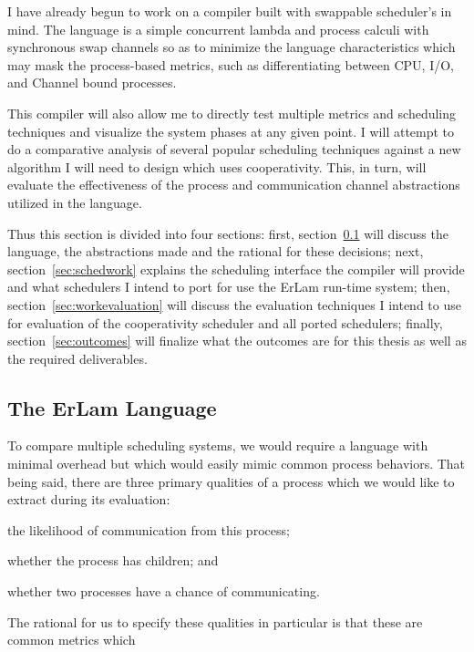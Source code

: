 I have already begun to work on a compiler built with swappable scheduler's in mind. The language
is a simple concurrent lambda and process calculi with synchronous swap channels so as to minimize 
the language characteristics which may mask the process-based metrics, such as differentiating between CPU, I/O,
and Channel bound processes. 

This compiler will also allow me to directly test multiple metrics and scheduling techniques and visualize the 
system phases at any given point. I will attempt to do a comparative analysis of several popular scheduling 
techniques against a new algorithm I will need to design which uses cooperativity. This, in turn, will evaluate 
the effectiveness of the process and communication channel abstractions utilized in the language.

Thus this section is divided into four sections: first, section~\ref{sec:erlamlang} will discuss the language, the
abstractions made and the rational for these decisions; next, section~\ref{sec:schedwork} explains the scheduling
interface the compiler will provide and what schedulers I intend to port for use the ErLam run-time system; then, 
section~\ref{sec:workevaluation} will discuss the evaluation techniques I intend to use for evaluation of the
cooperativity scheduler and all ported schedulers; finally, section~\ref{sec:outcomes} will finalize what the 
outcomes are for this thesis as well as the required deliverables.

\subsection{The ErLam Language}
\label{sec:erlamlang}

To compare multiple scheduling systems, we would require a language with minimal overhead but which would easily 
mimic common process behaviors. That being said, there are three primary qualities of a process which we would 
like to extract during its evaluation:
\begin{inparaenum}
\item the likelihood of communication from this process;
\item whether the process has children; and
\item whether two processes have a chance of communicating.
\end{inparaenum} 

The rational for us to specify these qualities in particular is that these are common metrics which 

